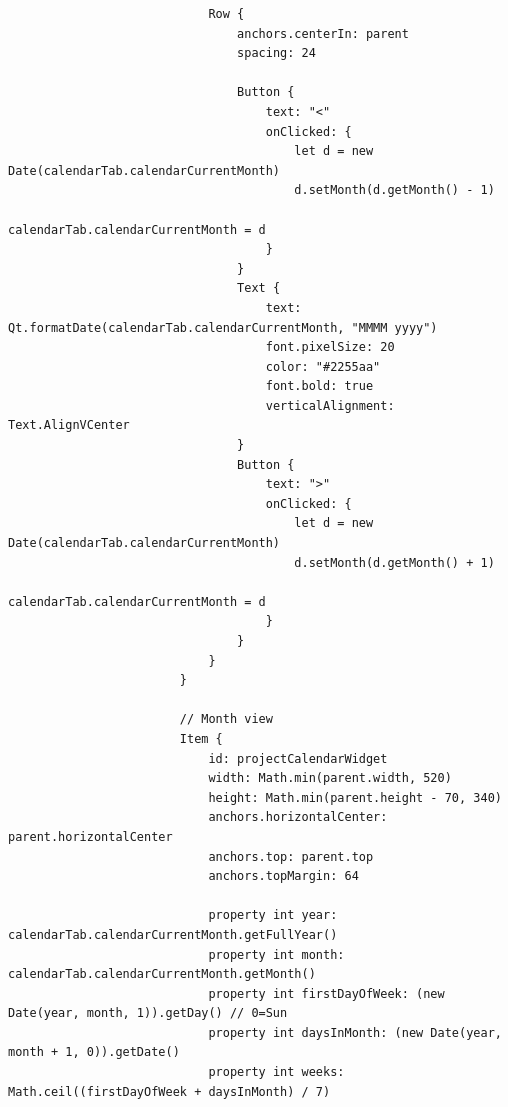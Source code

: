 \documentclass{report}
\begin{document}
\begin{lstlisting}
                            Row {
                                anchors.centerIn: parent
                                spacing: 24

                                Button {
                                    text: "<"
                                    onClicked: {
                                        let d = new Date(calendarTab.calendarCurrentMonth)
                                        d.setMonth(d.getMonth() - 1)
                                        calendarTab.calendarCurrentMonth = d
                                    }
                                }
                                Text {
                                    text: Qt.formatDate(calendarTab.calendarCurrentMonth, "MMMM yyyy")
                                    font.pixelSize: 20
                                    color: "#2255aa"
                                    font.bold: true
                                    verticalAlignment: Text.AlignVCenter
                                }
                                Button {
                                    text: ">"
                                    onClicked: {
                                        let d = new Date(calendarTab.calendarCurrentMonth)
                                        d.setMonth(d.getMonth() + 1)
                                        calendarTab.calendarCurrentMonth = d
                                    }
                                }
                            }
                        }

                        // Month view
                        Item {
                            id: projectCalendarWidget
                            width: Math.min(parent.width, 520)
                            height: Math.min(parent.height - 70, 340)
                            anchors.horizontalCenter: parent.horizontalCenter
                            anchors.top: parent.top
                            anchors.topMargin: 64

                            property int year: calendarTab.calendarCurrentMonth.getFullYear()
                            property int month: calendarTab.calendarCurrentMonth.getMonth()
                            property int firstDayOfWeek: (new Date(year, month, 1)).getDay() // 0=Sun
                            property int daysInMonth: (new Date(year, month + 1, 0)).getDate()
                            property int weeks: Math.ceil((firstDayOfWeek + daysInMonth) / 7)


\end{lstlisting}
\end{document}
